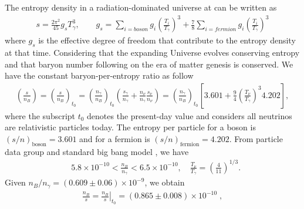 \documentclass[universe,article,submit,moreauthors,pdftex,a4paper]{Definitions/mdpi}
\begin{document}
The entropy density in a radiation-dominated universe at  can be written as \cite{Kolb:1990vq}
\begin{align}
s=\frac{2\pi^2}{45}g_sT_\gamma^3,\qquad g_s=\sum_{i=boson}g_i\left(\frac{T_i}{T_\gamma}\right)^3+\frac{7}{8}\sum_{i=fermion}g_i\left(\frac{T_i}{T_\gamma}\right)^3
\end{align}
where $g_s$ is the effective degree of freedom that contribute to the entropy density at that time.  Considering that the expanding Universe evolves conserving entropy and that baryon number following on the era of matter genesis is conserved. We have the constant  baryon-per-entropy ratio as follow
\begin{align}
\left(\frac{s}{n_B}\right)=\left(\frac{s}{n_B}\right)_{\!\!t_0}\!\!=\left(\frac{n_\gamma}{n_B}\right)_{\!\!t_0}\left(\frac{s_\gamma}{n_\gamma}+\frac{n_\nu}{n_\gamma}\frac{s_\nu}{n_\nu}\right)=\left(\frac{n_\gamma}{n_B}\right)_{\!\!t_0}\left[3.601+\frac{9}{4}\left(\frac{T_\nu}{T_\gamma}\right)^{\!\!3}4.202\right],
\end{align}
where the subscript $t_0$ denotes the present-day value and considers all neutrinos are relativistic particles today. The entropy per particle for a boson is $(s/n)_\mathrm{boson}=3.601$ and for a fermion is $(s/n)_\mathrm{fermion}=4.202$. From particle data group and standard big bang model \cite{ParticleDataGroup:2022pth,Kolb:1990vq}, we have
\begin{align}
&5.8\times10^{-10}<\frac{n_B}{n_\gamma}<6.5\times10^{-10},\quad\frac{T_\nu}{T_\gamma}=\left(\frac{4}{11}\right)^{1/3}.
\end{align}
Given $n_B/n_\gamma= (0.609\pm0.06)\times10^{-9}$, we obtain
\begin{align}\label{BdS}
\frac{n_B}{s}= \left.\frac{n_B}{s}\right|_{t_0}=(0.865\pm0.008)\times10^{-10} \;,
\end{align}
\end{document}
